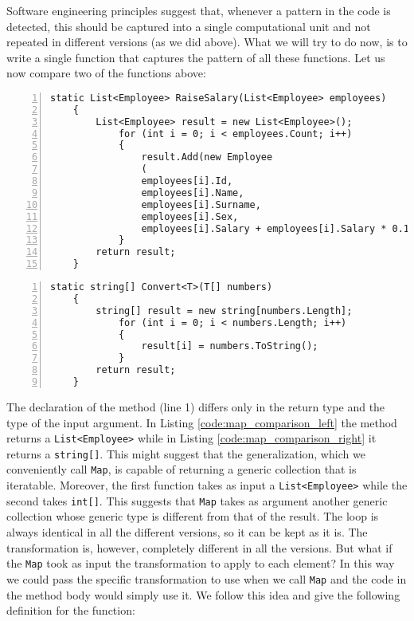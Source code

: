 Software engineering principles suggest that, whenever a pattern in the code is detected, this should be captured into a single computational unit and not repeated in different versions (as we did above). What we will try to do now, is to write a single function that captures the pattern of all these functions. Let us now compare two of the functions above:

\begin{minipage}[t]{0.45\textwidth}
	\begin{lstlisting}[numbers = left, label = code:map_comparison_left, caption = Code to raise the salary]
	static List<Employee> RaiseSalary(List<Employee> employees)
	{
		List<Employee> result = new List<Employee>();
			for (int i = 0; i < employees.Count; i++)
			{
				result.Add(new Employee
				(
				employees[i].Id,
				employees[i].Name,
				employees[i].Surname,
				employees[i].Sex,
				employees[i].Salary + employees[i].Salary * 0.1));
			}
		return result;
	}
	\end{lstlisting}
\end{minipage}\hfill
\begin{minipage}[t]{0.45\textwidth}
	\begin{lstlisting}[numbers = left, label = code:map_comparison_right, caption = Code to convert numbers into strings]
	static string[] Convert<T>(T[] numbers)
	{
		string[] result = new string[numbers.Length];
			for (int i = 0; i < numbers.Length; i++)
			{
				result[i] = numbers.ToString();
			}
		return result;
	}
	\end{lstlisting}
\end{minipage}

\noindent
The declaration of the method (line 1) differs only in the return type and the type of the input argument. In Listing \ref{code:map_comparison_left} the method returns a \texttt{List<Employee>} while in Listing \ref{code:map_comparison_right} it returns a \texttt{string[]}. This might suggest that the generalization, which we conveniently call \texttt{Map}, is capable of returning a generic collection that is iteratable. Moreover, the first function takes as input a \texttt{List<Employee>} while the second takes \texttt{int[]}. This suggests that \texttt{Map} takes as argument another generic collection whose generic type is different from that of the result.
The loop is always identical in all the different versions, so it can be kept as it is. The transformation is, however, completely different in all the versions. But what if the \texttt{Map} took as input the transformation to apply to each element? In this way we could pass the specific transformation to use when we call \texttt{Map} and the code in the method body would simply use it. We follow this idea and give the following definition for the function:

